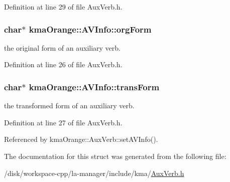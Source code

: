 Definition at line 29 of file AuxVerb.h.\hypertarget{structkmaOrange_1_1AVInfo_e27a83187cbb0e8cf03234f546e9ca56}{
\subsubsection[{orgForm}]{\setlength{\rightskip}{0pt plus 5cm}char$\ast$ {\bf kmaOrange::AVInfo::orgForm}}}
\label{structkmaOrange_1_1AVInfo_e27a83187cbb0e8cf03234f546e9ca56}


the original form of an auxiliary verb. 



Definition at line 26 of file AuxVerb.h.\hypertarget{structkmaOrange_1_1AVInfo_cb2b9ac82f0aaa7319607f5577527d1c}{
\subsubsection[{transForm}]{\setlength{\rightskip}{0pt plus 5cm}char$\ast$ {\bf kmaOrange::AVInfo::transForm}}}
\label{structkmaOrange_1_1AVInfo_cb2b9ac82f0aaa7319607f5577527d1c}


the transformed form of an auxiliary verb. 



Definition at line 27 of file AuxVerb.h.

Referenced by kmaOrange::AuxVerb::setAVInfo().

The documentation for this struct was generated from the following file:\begin{CompactItemize}
\item 
/disk/workspace-cpp/la-manager/include/kma/\hyperlink{AuxVerb_8h}{AuxVerb.h}\end{CompactItemize}
